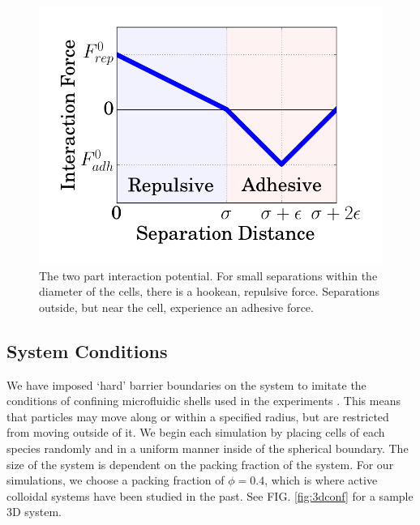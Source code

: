 \documentclass[aps,prb,twocolumn,groupedaddress,nofootinbib,floatfix]{revtex4}
\begin{document}
\begin{figure}
  \includegraphics[width=1.0\columnwidth]{interaction.png}
  \caption[capsuleECM]{The two part interaction potential. For small separations
    within the diameter of the cells, there is a hookean, repulsive force. Separations
    outside, but near the cell, experience an adhesive force.}
   \label{fig:interaction}
\end{figure}


\subsection*{System Conditions}
We have imposed `hard' barrier boundaries on the system to imitate the conditions
of confining microfluidic shells used in the experiments \cite{mingming}. This means that particles may move along or within a
specified radius, but are restricted from moving outside of it. 
We begin each simulation by placing cells of each species randomly and in a 
uniform manner inside of the spherical boundary.
The size of the system is dependent on the packing fraction of the system. 
For our simulations, we choose a packing fraction of $\phi=0.4$, which is where 
active colloidal systems have been studied in the past\cite{RednerBaskaran}.
See FIG. \ref{fig:3dconf} for a sample 3D system.
\end{document}
